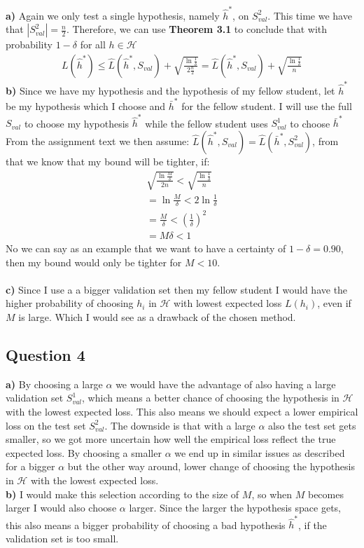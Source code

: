 \textbf{a)} Again we only test a single hypothesis, namely $\hat{h}^*$, on $S_{val}^2$. This time we have that $|S_{val}^2|=\frac{n}{2}$. Therefore, we can use \textbf{Theorem 3.1} to conclude that with probability $1 - \delta$ for all $h \in \mathcal{H}$
\begin{align}
L(\hat{h}^*) \leq \hat{L}(\hat{h}^*, S_{val}) + \sqrt{\frac{\ln \frac{1}{\delta}}{2\frac{n}{2}}} = \hat{L}(\hat{h}^*, S_{val}) + \sqrt{\frac{ \ln \frac{1}{\delta}}{n}}
\end{align}
\textbf{b)} 
Since we have my hypothesis and the hypothesis of my fellow student, let $\hat{h}^*$ be my hypothesis which I choose and $\bar{h}^*$ for the fellow student.
I will use the full $S_{val}$ to choose my hypothesis $\hat{h}^*$ while the fellow student uses $S^1_{val}$ to choose $\bar{h}^*$
From the assignment text we then assume:
$\hat{L}(\hat{h}^*,S_{val}) = \hat{L}(\bar{h}^*,S_{val}^2)$, from that we know that my bound will be tighter, if:
\begin{align}
\sqrt{\frac{\ln \frac{M}{\delta}}{2n}} < \sqrt{\frac{ \ln \frac{1}{\delta}}{n}}\\
= \ln \frac{M}{\delta} < 2 \ln \frac{1}{\delta}\\
= \frac{M}{\delta} < \left( \frac{1}{\delta} \right)^2\\
= M \delta < 1
\end{align}
No we can say as an example that we want to have a certainty of $1-\delta = 0.90$, then my bound would only be tighter for $M < 10$.\\\\
\textbf{c)} Since I use a a bigger validation set then my fellow student I would have the higher probability of choosing $h_i$ in $\mathcal{H}$ with lowest expected loss $L(h_i)$, even if $M$ is large. Which I would see as a drawback of the chosen method.
\subsection{Question 4}
\textbf{a)} By choosing a large $\alpha$ we would have the advantage of also having a large validation set $S_{val}^1$, which means a better chance of choosing the hypothesis in $\mathcal{H}$ with the lowest expected loss. This also means we should expect a lower empirical loss on the test set $S_{val}^2$.
The downside is that with a large $\alpha$ also the test set gets smaller, so we got more uncertain how well the empirical loss reflect the true expected loss.
By choosing a smaller $\alpha$ we end up in similar issues as described for a bigger $\alpha$ but the other way around, lower change of choosing the hypothesis in $\mathcal{H}$ with the lowest expected loss.\\
\textbf{b)} I would make this selection according to the size of $M$, so when $M$ becomes larger I would also choose $\alpha$ larger.
Since the larger the hypothesis space gets, this also means a bigger probability of choosing a bad hypothesis $\hat{h}^*$, if the validation set is too small.